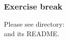 
\begin{frame}
\frametitle{\EmojiExercise \hmm Exercise break}

Please see directory:  \\
and its README.

\end{frame}






